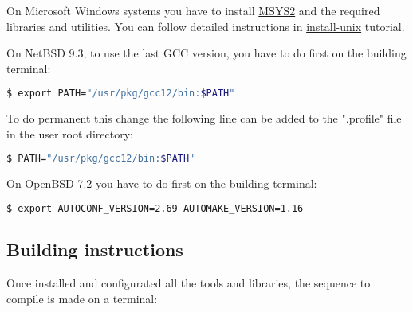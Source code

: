 On Microsoft Windows systems you have to install
\href{http://sourceforge.net/projects/msys2}{MSYS2} and the required
libraries and utilities. You can follow detailed instructions in
\href{https://github.com/jburguete/install-unix/blob/master/tutorial.pdf}{install-unix}
tutorial.

On NetBSD 9.3, to use the last GCC version, you have to do first on the
building terminal:
\begin{lstlisting}[language=bash]
$ export PATH="/usr/pkg/gcc12/bin:$PATH"
\end{lstlisting}
To do permanent this change the following line can be added to the ".profile"
file in the user root directory:
\begin{lstlisting}[language=bash]
$ PATH="/usr/pkg/gcc12/bin:$PATH"
\end{lstlisting}

On OpenBSD 7.2 you have to do first on the building terminal:
\begin{lstlisting}[language=bash]
$ export AUTOCONF_VERSION=2.69 AUTOMAKE_VERSION=1.16
\end{lstlisting}

\subsection{Building instructions}

Once installed and configurated all the tools and libraries, the sequence to
compile is made on a terminal:

